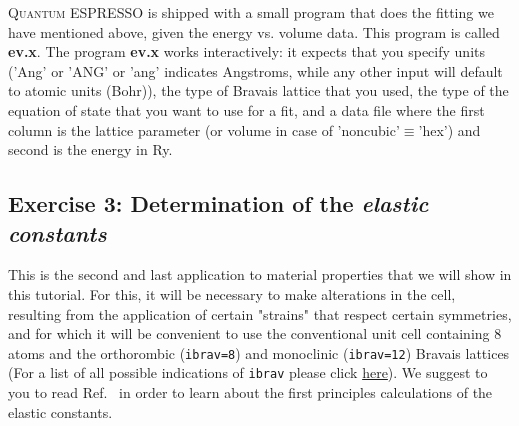 \documentclass[12pt]{article}
\def\QE{\textsc{Quantum ESPRESSO}\xspace}
\begin{document}

\QE is shipped with a small program that does the fitting we have mentioned above, given the energy vs. volume data. This program is called \textbf{ev.x}.
The program {\bf ev.x} works interactively: it expects that you specify units
('Ang' or 'ANG'  or 'ang' indicates Angstroms, while any other input will default
to atomic units (Bohr)), the type of Bravais lattice that you used, the type of the equation
of state that you want to use for a fit, and a data file where the first column is the
lattice parameter (or volume in case of 'noncubic'$\equiv$'hex') and second is the energy
in Ry.



\vspace{6mm}
\subsection{Exercise 3: Determination of the {\it elastic constants}}

This is the second and last application to material properties that we will show
in this tutorial.
For this, it will be necessary to make alterations in the cell, resulting from the
application of certain "strains" that respect certain symmetries, and for which it
will be convenient to use the conventional unit cell containing 8 atoms and the
orthorombic ({\tt ibrav=8}) and monoclinic ({\tt ibrav=12}) Bravais lattices
(For a list of all possible indications of {\tt ibrav} please click
\href{https://www.quantum-espresso.org/Doc/INPUT_PW.html#idm199}{here}).
We suggest to you to read Ref.~\cite{Mehl1994first} in order to learn about the first
principles calculations of the elastic constants.
\end{document}
